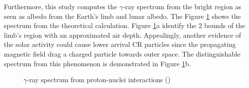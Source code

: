 Furthermore, this study computes the $\gamma$-ray spectrum from 
the bright region as seen as albedo from the Earth's limb and 
lunar albedo. The Figure \ref{fig:gamma_spectrum_earth_lunar} 
shows the spectrum from the theoretical calculation. Figure \ref{fig:gamma_spectrum_earth_lunar}a
identify the 2 bounds of the limb's region with an approximated air depth.
Appealingly, another evidence of the solar activity could cause lower arrival CR particles since the propagating magnetic field 
drag a charged particle towards outer space. The distinguishable
spectrum from this phenomenon is demonstrated in
Figure \ref{fig:gamma_spectrum_earth_lunar}b.


\begin{figure}[h!]
    \centering
        \hfill
        \caption{
            $\gamma$-ray spectrum from proton-nuclei interactions
            (\cite{Morris84})
        }
       \label{fig:gamma_spectrum_earth_lunar}
\end{figure}


